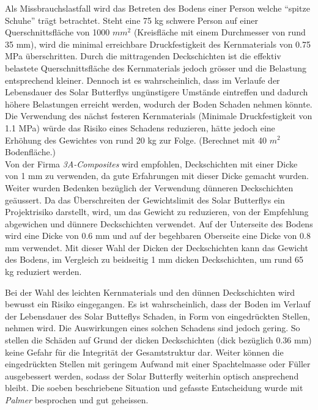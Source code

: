 Als Missbrauchslastfall wird das Betreten des Bodens einer Person welche ``spitze Schuhe'' trägt betrachtet. Steht eine 75 kg schwere Person auf einer Querschnittsfläche von 1000 $mm^2$ (Kreisfläche mit einem Durchmesser von rund 35 mm), wird die minimal erreichbare Druckfestigkeit des Kernmaterials von 0.75 MPa überschritten. Durch die mittragenden Deckschichten ist die effektiv belastete Querschnittsfläche des Kernmaterials jedoch grösser und die Belastung entsprechend kleiner. Dennoch ist es wahrscheinlich, dass im Verlaufe der Lebensdauer des Solar Butterflys ungünstigere Umstände eintreffen und dadurch höhere Belastungen erreicht werden, wodurch der Boden Schaden nehmen könnte. Die Verwendung des nächst festeren Kernmaterials (Minimale Druckfestigkeit von 1.1 MPa) würde das Risiko eines Schadens reduzieren, hätte jedoch eine Erhöhung des Gewichtes von rund 20 kg zur Folge. (Berechnet mit 40 $m^2$ Bodenfläche.)\\
Von der Firma \emph{3A-Composites} wird empfohlen, Deckschichten mit einer Dicke von 1 mm zu verwenden, da gute Erfahrungen mit dieser Dicke gemacht wurden. Weiter wurden Bedenken bezüglich der Verwendung dünneren Deckschichten geäussert. Da das Überschreiten der Gewichtslimit des Solar Butterflys ein Projektrisiko darstellt, wird, um das Gewicht zu reduzieren, von der Empfehlung abgewichen und dünnere Deckschichten verwendet. Auf der Unterseite des Bodens wird eine Dicke von 0.6 mm und auf der begehbaren Oberseite eine Dicke von 0.8 mm verwendet. Mit dieser Wahl der Dicken der Deckschichten kann das Gewicht des Bodens, im Vergleich zu beidseitig 1 mm dicken Deckschichten, um rund 65 kg reduziert werden.

Bei der Wahl des leichten Kernmaterials und den dünnen Deckschichten wird bewusst ein Risiko eingegangen. Es ist wahrscheinlich, dass der Boden im Verlauf der Lebensdauer des Solar Butteflys Schaden, in Form von eingedrückten Stellen, nehmen wird. Die Auswirkungen eines solchen Schadens sind jedoch gering. So stellen die Schäden auf Grund der dicken Deckschichten (dick bezüglich 0.36 mm) keine Gefahr für die Integrität der Gesamtstruktur dar. Weiter können die eingedrückten Stellen mit geringem Aufwand mit einer Spachtelmasse oder Füller ausgebessert werden, sodass der Solar Butterfly weiterhin optisch ansprechend bleibt. Die soeben beschriebene Situation und gefasste Entscheidung wurde mit \emph{Palmer} besprochen und gut geheissen.


